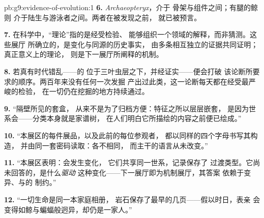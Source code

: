 \begin{solution}{pb:g9:evidence-of-evolution:1}
\textbf{6.} \emph{Archaeopteryx}，介于
骨架与组件之间；有腿的鲸则
介于陆生与游泳者之间。两者在被发现之前，
就已被预言。

\textbf{7.} 在科学中，“理论”指的是经受检验、
能够组织一个领域的解释，而非猜测。这些展厅
所确立的，是变化与同源的历史事实，
由多条相互独立的证据共同证明；真正意义上的理论，
则是下一展厅所阐释的机制。

\textbf{8.} 若真有时代错乱——的
位于三叶虫层之下，并经证实——便会打破
该论断所要求的顺序。两百年来没有任何一次发掘
产出过此类，这一论断每天都在经受最严峻的检验，
在一切仍在挖掘的地方持续通过。

\textbf{9.} “隔壁所见的套盒，
从来不是为了归档方便：特征之所以层层嵌套，
是因为世系会——分类本身就是家谱树，
在人们明白它所描绘的内容之前便已绘成。”

\textbf{10.} “本展区的每件展品，以及此前的每位参观者，
都以同样的四个字母书写其构造，
并由同一套密码读取：各不相同，
而主干的语言从未改变。”

\textbf{11.} “本展区表明：会发生变化，
它们共享同一世系，记录保存了
过渡类型。它尚未回答的，是什么\emph{驱动}
这种变化——下一展厅即为机制展厅，其答案
依赖于变异、与的
制约。”

\textbf{12.} “一切生命是同一本家庭相册，
岩石保存了最早的几页——假以时日，表亲
会变得如鲸与蝙蝠般迥异，却仍是一家人。”
\end{solution}
